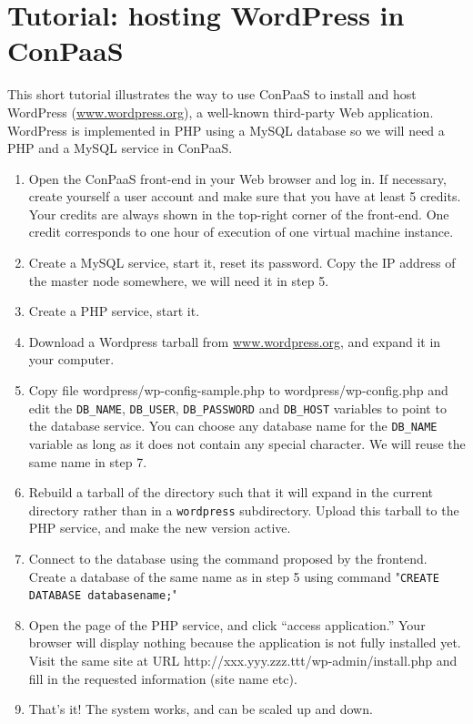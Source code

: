 \documentclass[10pt]{article}
\begin{document}
\section{Tutorial: hosting WordPress in ConPaaS}

This short tutorial illustrates the way to use ConPaaS to install and host WordPress (\url{www.wordpress.org}), a well-known third-party Web application. WordPress is implemented in PHP using a MySQL database so we will need a PHP and a MySQL service in ConPaaS.

\begin{enumerate}
\item Open the ConPaaS front-end in your Web browser and log in. If
  necessary, create yourself a user account and make sure that you
  have at least 5 credits. Your credits are always shown in the
  top-right corner of the front-end. One credit corresponds to one
  hour of execution of one virtual machine instance.
\item Create a MySQL service, start it, reset its password. Copy the
  IP address of the master node somewhere, we will need it in step 5.
\item Create a PHP service, start it.
\item Download a Wordpress tarball from \url{www.wordpress.org}, and
  expand it in your computer.
\item Copy file wordpress/wp-config-sample.php to
  wordpress/wp-config.php and edit the \texttt{DB\_NAME},
  \texttt{DB\_USER}, \texttt{DB\_PASSWORD} and \texttt{DB\_HOST}
  variables to point to the database service. You can choose any
  database name for the \texttt{DB\_NAME} variable as long as it does
  not contain any special character. We will reuse the same name in
  step 7.
\item Rebuild a tarball of the directory such that it will expand in
  the current directory rather than in a \texttt{wordpress}
  subdirectory. Upload this tarball to the PHP service, and make the
  new version active. 
\item Connect to the database using the command proposed by the
  frontend. Create a database of the same name as in step 5 using
  command "\texttt{CREATE DATABASE databasename;}"
\item Open the page of the PHP service, and click ``access
  application.'' Your browser will display nothing because the
  application is not fully installed yet. Visit the same site at URL
  http://xxx.yyy.zzz.ttt/wp-admin/install.php and fill in the
  requested information (site name etc).
\item That's it! The system works, and can be scaled up and down. 
\end{enumerate}
\end{document}
